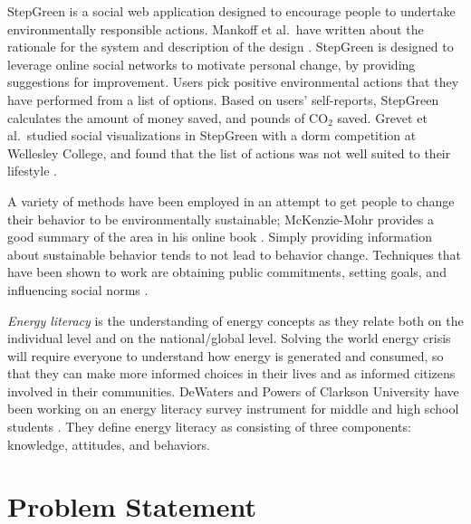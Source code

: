 \documentclass{chi-ext}
\begin{document}
\begin{multicols}{2}
StepGreen is a social web application designed to encourage people to undertake environmentally responsible actions. Mankoff et al.\ have written about the rationale for the system and description of the design  \cite{Mankoff2007Leveraging-Soci}. StepGreen is designed to leverage online social networks to motivate personal change, by providing suggestions for improvement. Users pick positive environmental actions that they have performed from a list of options. Based on users' self-reports, StepGreen calculates the amount of money saved, and pounds of CO$_2$ saved. Grevet et al.\ studied social visualizations in StepGreen with a dorm competition at Wellesley College, and found that the list of actions was not well suited to their lifestyle \cite{Grevet10}.

A variety of methods have been employed in an attempt to get people to change their behavior to be environmentally sustainable; McKenzie-Mohr provides a good summary of the area in his online book \cite{McKenzie-Mohr2009}. Simply providing information about sustainable behavior tends to not lead to behavior change. Techniques that have been shown to work are obtaining public commitments, setting goals, and influencing social norms \cite{Pallak80, Becker78, Schultz2007SocialNorms}. 

\emph{Energy literacy} is the understanding of energy concepts as they relate both on the individual level and on the national/global level. Solving the world energy crisis will require everyone to understand how energy is generated and consumed, so that they can make more informed choices in their lives and as informed citizens involved in their communities. DeWaters and Powers of Clarkson University have been working on an energy literacy survey instrument for middle and high school students \cite{DeWaters09}. They define energy literacy as consisting of three components: knowledge, attitudes, and behaviors.

\section{Problem Statement}



\end{multicols}
\end{document}
